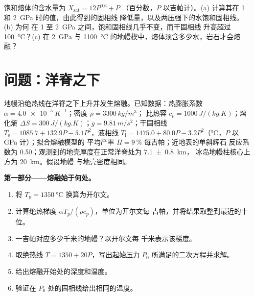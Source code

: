\begin{exercise}[$\star\star\star$]\label{exo:b2:mantle-melting:12}
饱和熔体的含水量为 $X_{\mathrm{sat}} = 12P^{0.6} + P$
（百分数，$P$ 以吉帕计）。(a) 计算其在 1 和 \qty{2}{GPa} 时的值，由此得到的固相线
降低量，以及两压强下的水饱和固相线。(b) 为何
在 1 至 \qty{2}{GPa} 之间，饱和固相线几乎不变，而干固相线
升高超过 \qty{100}{\celsius}？(c) 在 \qty{2}{GPa} 与
\qty{1100}{\celsius} 的地幔楔中，熔体须含多少水，岩石才会熔融？
\end{exercise}

\section{问题：洋脊之下}

\begin{problem}
\label{pb:b2:mantle-melting:1}
地幔沿绝热线在洋脊之下上升并发生熔融。已知数据：热膨胀系数
$\alpha = \qty{4.0e-5}{K^{-1}}$；密度 $\rho = \qty{3300}{kg/m^3}$；
比热容 $c_p = \qty{1000}{J/(kg.K)}$；熔化熵 $\Delta S =
\qty{300}{J/(kg.K)}$；$g = \qty{9.81}{m/s^2}$；干固相线 $T_{\mathrm s} =
1085.7 + 132.9P - 5.1P^2$，液相线 $T_{\mathrm l} = 1475.0 +
80.0P - 3.2P^2$（\unit{\celsius}，$P$ 以 \unit{GPa} 计）；拟合熔融模型的
平均产率 $\Pi = \qty{9}{\percent}$ 每吉帕；近地表的单斜辉石
反应系数为 0.50；观测到的地壳厚度在正常洋脊处为 \qty[uncertainty-mode=separate]{7.1 \pm 0.8}{km}，
冰岛地幔柱核心上方为 \qty{20}{km}。假设地幔
与地壳密度相同。

\noindent\textbf{第一部分——熔融始于何处。}
\begin{enumerate}
\item 将 $T_p = \qty{1350}{\celsius}$ 换算为开尔文。
\item 计算绝热梯度 $\alpha T_p/(\rho c_p)$，单位为开尔文每
吉帕，并将结果取整到最近的十位。
\item 一吉帕对应多少千米的地幔？以开尔文每
千米表示该梯度。
\item 取绝热线 $T = 1350 + 20P$，写出起始压力
$P_0$ 所满足的二次方程并求解。
\item 给出熔融开始处的深度和温度。
\item 验证在 $P_0$ 处的固相线给出相同的温度。
\end{enumerate}


\end{problem}
